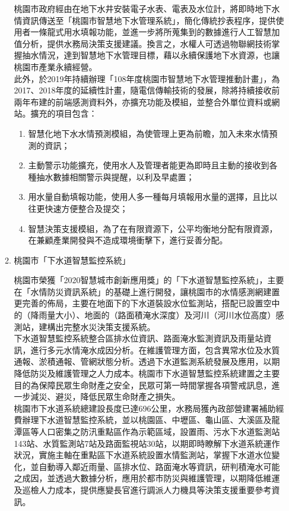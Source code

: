 \documentclass[a4paper,12pt]{article}
\begin{document}
\begin{enumerate}
\begin{enumerate}
桃園市政府經由在地下水井安裝電子水表、電表及水位計，將即時地下水情資訊傳送至「桃園市智慧地下水管理系統」，簡化傳統抄表程序，提供使用者一條龍式用水填報功能，並進一步將所蒐集到的數據進行人工智慧加值分析，提供水務局決策支援建議。換言之，水權人可透過物聯網技術掌握抽水情況，達到智慧地下水管理目標，藉以永續保護地下水資源，也讓桃園市產業永續經營。\\

此外，於2019年持續辦理「108年度桃園市智慧地下水管理推動計畫」，為2017、2018年度的延續性計畫，隨電信傳輸技術的發展，除將持續接收前兩年布建的前端感測資料外，亦擴充功能及模組，並整合外單位資料或網站。擴充的項目包含：\\
\begin{enumerate}
\item 智慧化地下水水情預測模組，為使管理上更為前瞻，加入未來水情預測的資訊；\\
\item 主動警示功能擴充，使用水人及管理者能更為即時且主動的接收到各種抽水數據相關警示與提醒，以利及早處置；\\
\item 用水量自動填報功能，使用人多一種每月填報用水量的選擇，且比以往更快速方便整合及提交；\\
\item 智慧決策支援模組，為了在有限資源下，公平均衡地分配有限資源，在兼顧產業開發與不造成環境衝擊下，進行妥善分配。\\
\end{enumerate}
\item 桃園市「下水道智慧監控系統」
\label{sec:orga4ddcea}

桃園市榮獲「2020智慧城市創新應用獎」的「下水道智慧監控系統」，主要在「水情防災資訊系統」的基礎上進行開發，讓桃園市的水情感測網建置更完善的佈局，主要在地面下的下水道裝設水位監測站，搭配已設置空中的（降雨量大小）、地面的（路面積淹水深度）及河川（河川水位高度）感測站，建構出完整水災決策支援系統。\\

下水道智慧監控系統整合區排水位資訊、路面淹水監測資訊及雨量站資訊，進行多元水情淹水成因分析。在維護管理方面，包含異常水位及水質通報、淤積通報、管網狀態分析。透過下水道監測系統發展及應用，以期降低防災及維護管理之人力成本。桃園市下水道智慧監控系統建置之主要目的為保障民眾生命財產之安全，民眾可第一時間掌握各項警戒訊息，進一步減災、避災，降低民眾生命財產之損失。\\

桃園市下水道系統總建設長度已達696公里，水務局獲內政部營建署補助經費辦理下水道智慧監控系統，並以桃園區、中壢區、龜山區、大溪區及龍潭區等人口密集之防汛重點區作為示範區域，設置雨、污水下水道監測站143站、水質監測站7站及路面監視站30站，以期即時瞭解下水道系統運作狀況，實施主軸在重點區下水道系統設置水情監測站，掌握下水道水位變化，並自動導入鄰近雨量、區排水位、路面淹水等資訊，研判積淹水可能之成因，並透過大數據分析，應用於都市防災與維護管理，以期降低維運及巡檢人力成本，提供應變長官進行調派人力機具等決策支援重要參考資訊。\\


\end{enumerate}
\end{enumerate}
\end{document}

